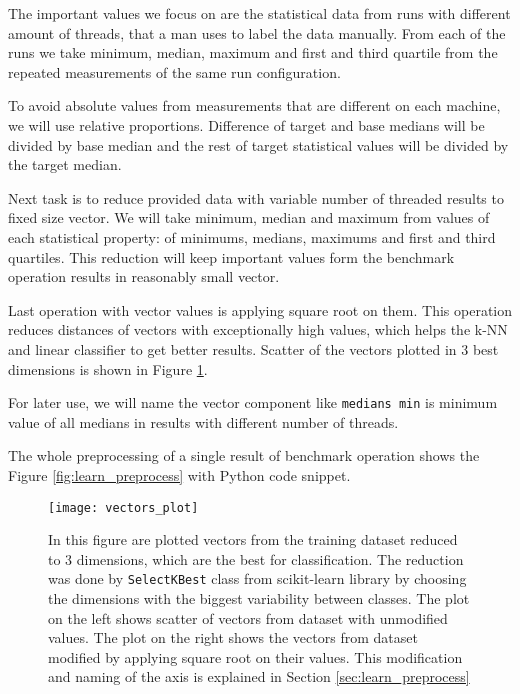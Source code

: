 The important values we focus on are the statistical data from runs with
different amount of threads, that a man uses to label the data manually. From
each of the runs we take minimum, median, maximum and first and third quartile
from the repeated measurements of the same run configuration.

To avoid absolute values from measurements that are different on each machine,
we will use relative proportions. Difference of target and base medians will be
divided by base median and the rest of target statistical values will be divided
by the target median.

Next task is to reduce provided data with variable number of threaded results
to fixed size vector. We will take minimum, median and maximum from values of
each statistical property: of minimums, medians, maximums and first and third
quartiles. This reduction will keep important values form the benchmark
operation results in reasonably small vector.

Last operation with vector values is applying square root on them. This
operation reduces distances of vectors with exceptionally high values, which
helps the k-NN and linear classifier to get better results. Scatter of the
vectors plotted in 3 best dimensions is shown in Figure \ref{fig:vectors_plot}.

For later use, we will name the vector component like \texttt{medians min} is
minimum value of all medians in results with different number of threads.

The whole preprocessing of a single result of benchmark operation shows the
Figure \ref{fig:learn_preprocess} with Python code snippet.

\begin{figure}
  \centering
  \texttt{[image: vectors\_plot]}
  \caption{In this figure are plotted vectors from the training dataset reduced
    to 3 dimensions, which are the best for classification. The reduction was done by
    \texttt{SelectKBest} class from scikit-learn library by choosing the
    dimensions with the biggest variability between classes. The plot on the
    left shows scatter of vectors from dataset with unmodified values. The plot
    on the right shows the vectors from dataset modified by applying square root
    on their values. This modification and naming of the axis is explained in
    Section \ref{sec:learn_preprocess}}
  \label{fig:vectors_plot}
\end{figure}


